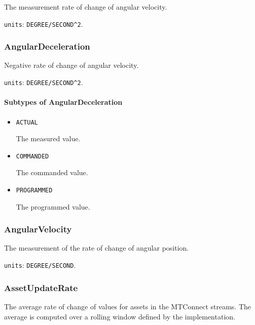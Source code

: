 The measurement rate of change of angular velocity.


\texttt{units}: \texttt{DEGREE/SECOND\^{}2}.


\subsubsection{AngularDeceleration}
\label{sec:AngularDeceleration}



Negative rate of change of angular velocity.


\texttt{units}: \texttt{DEGREE/SECOND\^{}2}.

\paragraph{Subtypes of AngularDeceleration}\mbox{}
\label{sec:Subtypes of AngularDeceleration}

\begin{itemize}

\item \texttt{ACTUAL}


The measured value.

\item \texttt{COMMANDED}


The commanded value.

\item \texttt{PROGRAMMED}


The programmed value.


\end{itemize}






\subsubsection{AngularVelocity}
\label{sec:AngularVelocity}



The measurement of the rate of change of angular position.


\texttt{units}: \texttt{DEGREE/SECOND}.


\subsubsection{AssetUpdateRate}
\label{sec:AssetUpdateRate}



The average rate of change of values for assets in the MTConnect streams. The average is computed over a rolling window defined by the implementation.


